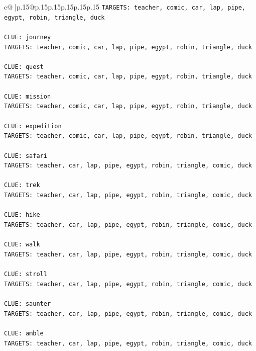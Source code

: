\documentclass{article}
\begin{document}
{\begin{supertabular}{c@{$\;$}|p{.15\linewidth}@{}p{.15\linewidth}p{.15\linewidth}p{.15\linewidth}p{.15\linewidth}p{.15\linewidth}}
{{{\texttt{TARGETS: teacher, comic, car, lap, pipe, egypt, robin, triangle, duck} \\
\\ 
\texttt{CLUE: journey} \\
\texttt{TARGETS: teacher, comic, car, lap, pipe, egypt, robin, triangle, duck} \\
\\ 
\texttt{CLUE: quest} \\
\texttt{TARGETS: teacher, comic, car, lap, pipe, egypt, robin, triangle, duck} \\
\\ 
\texttt{CLUE: mission} \\
\texttt{TARGETS: teacher, comic, car, lap, pipe, egypt, robin, triangle, duck} \\
\\ 
\texttt{CLUE: expedition} \\
\texttt{TARGETS: teacher, comic, car, lap, pipe, egypt, robin, triangle, duck} \\
\\ 
\texttt{CLUE: safari} \\
\texttt{TARGETS: teacher, car, lap, pipe, egypt, robin, triangle, comic, duck} \\
\\ 
\texttt{CLUE: trek} \\
\texttt{TARGETS: teacher, car, lap, pipe, egypt, robin, triangle, comic, duck} \\
\\ 
\texttt{CLUE: hike} \\
\texttt{TARGETS: teacher, car, lap, pipe, egypt, robin, triangle, comic, duck} \\
\\ 
\texttt{CLUE: walk} \\
\texttt{TARGETS: teacher, car, lap, pipe, egypt, robin, triangle, comic, duck} \\
\\ 
\texttt{CLUE: stroll} \\
\texttt{TARGETS: teacher, car, lap, pipe, egypt, robin, triangle, comic, duck} \\
\\ 
\texttt{CLUE: saunter} \\
\texttt{TARGETS: teacher, car, lap, pipe, egypt, robin, triangle, comic, duck} \\
\\ 
\texttt{CLUE: amble} \\
\texttt{TARGETS: teacher, car, lap, pipe, egypt, robin, triangle, comic, duck} \\
}}}
\end{supertabular}}
\end{document}
